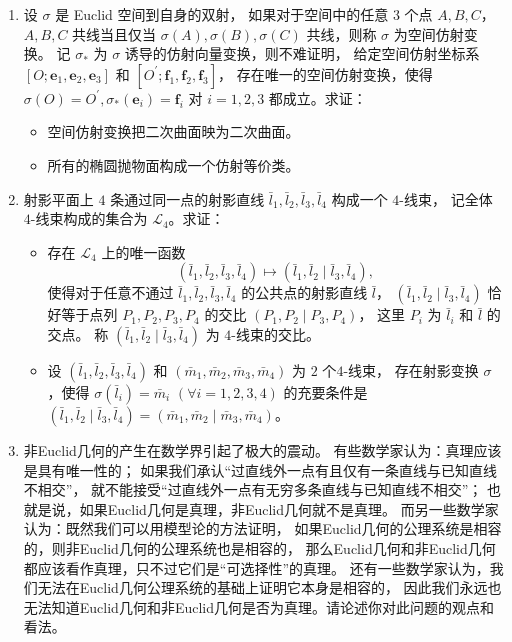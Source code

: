 \begin{enumerate}
\item 设 $\sigma$ 是 Euclid 空间到自身的双射，
如果对于空间中的任意 $3$ 个点 $A, B, C$，
$A, B, C$ 共线当且仅当 $\sigma(A), \sigma(B), \sigma(C)$ 共线，则称 $\sigma$ 为空间仿射变换。
记 $\sigma_{*}$ 为 $\sigma$ 诱导的仿射向量变换，则不难证明，
给定空间仿射坐标系 $[O ; \mathbf{e}_{1}, \mathbf{e}_{2}, \mathbf{e}_{3}]$ 
和 $[O^{\prime} ; \mathbf{f}_{1}, \mathbf{f}_{2}, \mathbf{f}_{3}]$，
存在唯一的空间仿射变换，使得 $\sigma(O)=O^{\prime}, \sigma_{*}(\mathbf{e}_{i})=\mathbf{f}_{i}$ 对 $i=1,2,3$ 都成立。求证：
\begin{itemize}
\item[(a)] 空间仿射变换把二次曲面映为二次曲面。
\item[(b)] 所有的椭圆抛物面构成一个仿射等价类。
\end{itemize}
\item 射影平面上 $4$ 条通过同一点的射影直线 $\bar{l}_{1}, \bar{l}_{2}, \bar{l}_{3}, \bar{l}_{4}$ 构成一个 $4$-线束，
记全体 $4$-线束构成的集合为 $\mathcal{L}_{4}$。求证：
\begin{itemize}
\item[(a)] 存在 $\mathcal{L}_{4}$ 上的唯一函数
$$(\bar{l}_{1}, \bar{l}_{2}, \bar{l}_{3}, \bar{l}_{4}) 
\mapsto (\bar{l}_{1}, \bar{l}_{2} \mid \bar{l}_{3}, \bar{l}_{4}),$$
使得对于任意不通过 $\bar{l}_{1}, \bar{l}_{2}, \bar{l}_{3}, \bar{l}_{4}$ 的公共点的射影直线 $\bar{l}$，
$(\bar{l}_{1}, \bar{l}_{2} \mid \bar{l}_{3}, \bar{l}_{4})$ 
恰好等于点列 $P_{1}, P_{2}, P_{3}, P_{4}$ 的交比 $(P_{1}, P_{2} \mid P_{3}, P_{4})$，
这里 $P_{i}$ 为 $\bar{l}_{i}$ 和 $\bar{l}$ 的交点。
称 $(\bar{l}_{1}, \bar{l}_{2} \mid \bar{l}_{3}, \bar{l}_{4})$ 为 $4$-线束的交比。
\item[(b)] 设 $(\bar{l}_{1}, \bar{l}_{2}, \bar{l}_{3}, \bar{l}_{4})$ 
和 $(\bar{m}_{1}, \bar{m}_{2}, \bar{m}_{3}, \bar{m}_{4})$ 为 $2$ 个$4$-线束，
存在射影变换 $\sigma$，使得 $\sigma(\bar{l}_{i})=\bar{m}_{i}$ $(\forall i=1,2,3,4)$ 的充要条件是 
$(\bar{l}_{1}, \bar{l}_{2} \mid \bar{l}_{3}, \bar{l}_{4})
=(\bar{m}_{1}, \bar{m}_{2} \mid \bar{m}_{3}, \bar{m}_{4})$。
\end{itemize}
\item 非Euclid几何的产生在数学界引起了极大的震动。
有些数学家认为：真理应该是具有唯一性的；
如果我们承认``过直线外一点有且仅有一条直线与已知直线不相交''，
就不能接受``过直线外一点有无穷多条直线与已知直线不相交''；
也就是说，如果Euclid几何是真理，非Euclid几何就不是真理。
而另一些数学家认为：既然我们可以用模型论的方法证明，
如果Euclid几何的公理系统是相容的，则非Euclid几何的公理系统也是相容的，
那么Euclid几何和非Euclid几何都应该看作真理，只不过它们是``可选择性''的真理。
还有一些数学家认为，我们无法在Euclid几何公理系统的基础上证明它本身是相容的，
因此我们永远也无法知道Euclid几何和非Euclid几何是否为真理。请论述你对此问题的观点和看法。
\end{enumerate}
~\\


